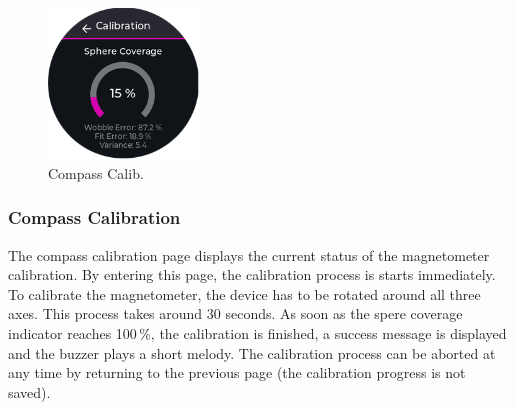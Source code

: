 \begin{minipage}{\linewidth}
	\begin{figure}
		\vspace{-0.6cm}
		\includegraphics[width=4cm]{images/6_design_final/gui/09_compass_calibration.png}
		\centering
		\caption{Compass Calib.}
		\label{fig:final_design_gui_compass_calibration}
	\end{figure}
	\subsubsection{Compass Calibration}
	The compass calibration page displays the current status of the magnetometer calibration.
	By entering this page, the calibration process is starts immediately.
	To calibrate the magnetometer, the device has to be rotated around all three axes.
	This process takes around 30 seconds.
	As soon as the spere coverage indicator reaches 100\,\%, the calibration is finished, a success message is displayed and the buzzer plays a short melody.
	The calibration process can be aborted at any time by returning to the previous page (the calibration progress is not saved).
\end{minipage}
\vspace{-0.2cm}

